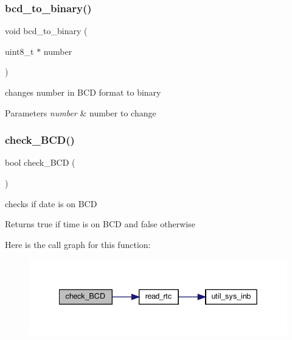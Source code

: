 \subsubsection{\texorpdfstring{bcd\+\_\+to\+\_\+binary()}{bcd\_to\_binary()}}
{\footnotesize\ttfamily void bcd\+\_\+to\+\_\+binary (\begin{DoxyParamCaption}\item[{uint8\+\_\+t $\ast$}]{number }\end{DoxyParamCaption})}



changes number in B\+CD format to binary 


\begin{DoxyParams}{Parameters}
{\em number} & number to change \\
\hline
\end{DoxyParams}
\mbox{\label{group__RealTimeClock_gab79ee864e66f8b74b5d0120a57a2c4f7}} 
\subsubsection{\texorpdfstring{check\+\_\+\+B\+C\+D()}{check\_BCD()}}
{\footnotesize\ttfamily bool check\+\_\+\+B\+CD (\begin{DoxyParamCaption}{ }\end{DoxyParamCaption})}



checks if date is on B\+CD 

\begin{DoxyReturn}{Returns}
true if time is on B\+CD and false otherwise 
\end{DoxyReturn}
Here is the call graph for this function\+:\nopagebreak
\begin{figure}[H]
\begin{center}
\leavevmode
\includegraphics[width=342pt]{group__RealTimeClock_gab79ee864e66f8b74b5d0120a57a2c4f7_cgraph}
\end{center}
\end{figure}
\mbox{\label{group__RealTimeClock_ga18fb6b60ca3519b4c5943902893f89eb}} 
